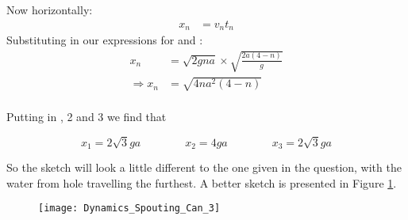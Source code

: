 \begin{problem}
{\begin{enumerate}
Now horizontally:
\begin{eqnarray*} 
x_{n}&= v_{n}t_{n}
\end{eqnarray*}  
Substituting in our expressions for  and :
\begin{eqnarray*}
 x_{n}&= \sqrt{2gna}\times\sqrt{\frac{2a\left(4-n\right)}{g}} \\ 
\Rightarrow x_{n}&= \sqrt{4na^2\left(4-n\right)} \\ 
\end{eqnarray*}

Putting in \value{n}{1}{}, 2 and 3 we find that

\begin{equation*}
x_1 = 2\sqrt{3}ga \quad\quad\quad\quad x_2 = 4ga \quad\quad\quad\quad x_3 = 2\sqrt{3}ga
\end{equation*}

So the sketch will look a little different to the one given in the question, with the water from hole  travelling the furthest. A better sketch is presented in Figure \ref{fig:Dynamics_Spouting_Can_3}.

\begin{figure}[h]
	\centering
	\texttt{[image: Dynamics\_Spouting\_Can\_3]}
	\caption{}\label{fig:Dynamics_Spouting_Can_3}
\end{figure}

\end{enumerate}
}
\end{problem}